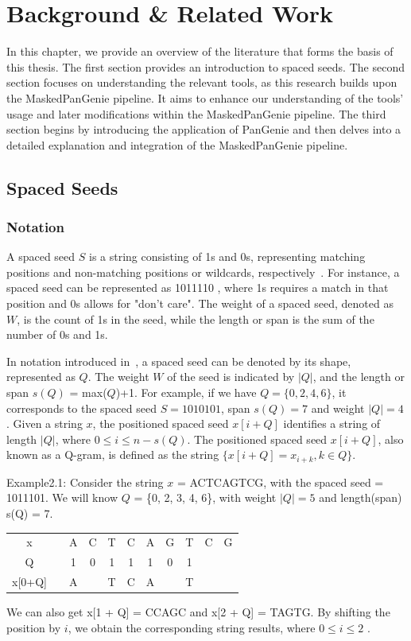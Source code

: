 \documentclass{PHlab-thesis}
\begin{document}
\chapter{Background \& Related Work}
In this chapter, we provide an overview of the literature that forms the basis of this thesis. The first section provides an introduction to spaced seeds. The second section focuses on understanding the relevant tools, as this research builds upon the MaskedPanGenie pipeline. It aims to enhance our understanding of the tools' usage and later modifications within the MaskedPanGenie pipeline. The third section begins by introducing the application of PanGenie and then delves into a detailed explanation and integration of the MaskedPanGenie pipeline.
\section{Spaced Seeds}
\subsection{Notation}
A spaced seed $S$ is a string consisting of 1s and 0s, representing matching positions and non-matching positions or wildcards, respectively~\cite{Petrucci2020ISSH}. For instance, a spaced seed can be represented as 1011110 , where 1s requires a match in that position and 0s allows for "don't care". The weight of a spaced seed, denoted as $W$, is the count of 1s in the seed, while the length or span is the sum of the number of 0s and 1s.

In notation introduced in~\cite{Keich2004Spacedseeds}, a spaced seed can be denoted by its shape, represented as $Q$. The weight $W$ of the seed is indicated by $\left | Q \right |$, and the length or span $s(Q)$ = max($Q$)+1. For example, if we have $Q=\{0, 2, 4, 6\}$, it corresponds to the spaced seed $S=1010101$, span $s(Q)=7$ and weight $\left | Q \right | = 4$ .
Given a string $x$, the positioned spaced seed $x[i+Q]$ identifies a string of length $\left | Q \right |$, where $0\leq i\leq n-s(Q)$. The positioned spaced seed $x[i+Q]$, also known as a Q-gram, is defined as the string $\{x[i+Q] = {x_{i+k},k\in Q}\}$.

Example2.1: Consider the string $x$ = ACTCAGTCG, with the spaced seed = 1011101. We will know $Q$ = \{0, 2, 3, 4, 6\}, with weight $\left| Q \right | = 5$ and length(span) s(Q) = 7. 
\begin{center}   
\begin{tabular}{ccccccccccc}
x& & A & C & T & C & A & G & T & C & G\\
Q& & 1 & 0 & 1 & 1 & 1 & 0 & 1 & &\\
x[0+Q] & & A & & T & C & A & & T & &\\
\end{tabular}
\end{center} 
We can also get x[1 + Q] = CCAGC and x[2 + Q] = TAGTG. By shifting the position by $i$, we obtain the corresponding string results, where $0\leq i\leq 2$ .
\end{document}
